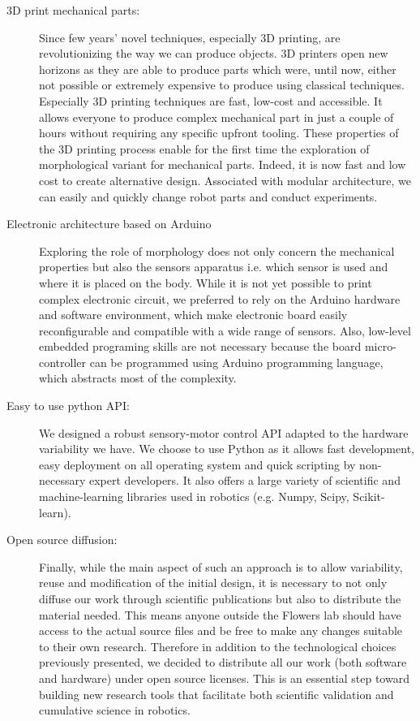 \begin{description}
    \item[3D print mechanical parts:] Since few years’ novel techniques, especially 3D printing, are revolutionizing the way we can produce objects. 3D printers open new horizons as they are able to produce parts which were, until now, either not possible or extremely expensive to produce using classical techniques. Especially 3D printing techniques are fast, low-cost and accessible. It allows everyone to produce complex mechanical part in just a couple of hours without requiring any specific upfront tooling.
    These properties of the 3D printing process enable for the first time the exploration of morphological variant for mechanical parts. Indeed, it is now fast and low cost to create alternative design. Associated with modular architecture, we can easily and quickly change robot parts and conduct experiments.
    \item[Electronic architecture based on Arduino] Exploring the role of morphology does not only concern the mechanical properties but also the sensors apparatus i.e. which sensor is used and where it is placed on the body. While it is not yet possible to print complex electronic circuit, we preferred to rely on the Arduino hardware and software environment, which make electronic board easily reconfigurable and compatible with a wide range of sensors. Also, low-level embedded programing skills are not necessary because the board micro-controller can be programmed using Arduino programming language, which abstracts most of the complexity.
    \item[Easy to use python API:] We designed a robust sensory-motor control API adapted to the hardware variability we have. We choose to use Python as it allows fast development, easy deployment on all operating system and quick scripting by non-necessary expert developers. It also offers a large variety of scientific and machine-learning libraries used in robotics (e.g. Numpy, Scipy, Scikit-learn).
    \item[Open source diffusion:] Finally, while the main aspect of such an approach is to allow variability, reuse and modification of the initial design, it is necessary to not only diffuse our work through scientific publications but also to distribute the material needed. This means anyone outside the Flowers lab should have access to the actual source files and be free to make any changes suitable to their own research. Therefore in addition to the technological choices previously presented, we decided to distribute all our work (both software and hardware) under open source licenses. This is an essential step toward building new research tools that facilitate both scientific validation and cumulative science in robotics.

\end{description}

